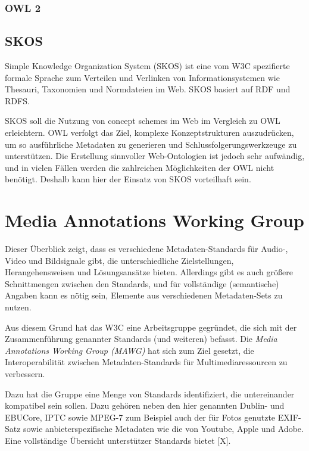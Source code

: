 	
	\subsubsection{OWL 2}
	
	\subsection{SKOS}
	Simple Knowledge Organization System (SKOS) ist eine vom W3C spezifierte formale Sprache zum Verteilen und Verlinken von Informationsystemen wie Thesauri, Taxonomien und Normdateien im Web. SKOS basiert auf RDF und RDFS.
	
	SKOS soll die Nutzung von concept schemes im Web im Vergleich zu OWL erleichtern. OWL verfolgt das Ziel, komplexe Konzeptstrukturen auszudrücken, um so ausführliche Metadaten zu generieren und Schlussfolgerungswerkzeuge zu unterstützen. Die Erstellung sinnvoller Web-Ontologien ist jedoch sehr aufwändig, und in vielen Fällen werden die zahlreichen Möglichkeiten der OWL nicht benötigt. Deshalb kann hier der Einsatz von SKOS vorteilhaft sein.


	\section{Media Annotations Working Group}
	Dieser Überblick zeigt, dass es verschiedene Metadaten-Standards für Audio-, Video und Bildsignale gibt, die unterschiedliche Zielstellungen, Herangehensweisen und Lösungsansätze bieten. Allerdings gibt es auch größere Schnittmengen zwischen den Standards, und für vollständige (semantische) Angaben kann es nötig sein, Elemente aus verschiedenen Metadaten-Sets zu nutzen.
	
	Aus diesem Grund hat das W3C eine Arbeitsgruppe gegründet, die sich mit der Zusammenführung genannter Standards (und weiteren) befasst. Die \emph{Media Annotations Working Group (MAWG)} hat sich zum Ziel gesetzt, die Interoperabilität zwischen Metadaten-Standards für Multimediaressourcen zu verbessern.
	
	Dazu hat die Gruppe eine Menge von Standards identifiziert, die untereinander kompatibel sein sollen. Dazu gehören neben den hier genannten Dublin- und EBUCore, IPTC %
	sowie MPEG-7 zum Beispiel auch der für Fotos genutzte EXIF-Satz sowie anbieterspezifische Metadaten wie die von Youtube, Apple und Adobe. Eine vollständige Übersicht unterstützer Standards bietet [X]. %
	
